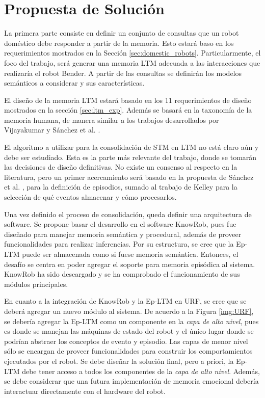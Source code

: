 \section{Propuesta de Solución}

%

La primera parte consiste en definir un conjunto de consultas que un robot doméstico debe responder a partir de la memoria. Esto estará baso en los requerimientos mostrados en la Sección \ref{sec:domestic_robots}. Particularmente, el foco del trabajo, será generar una memoria LTM adecuada a las interacciones que realizaría el robot Bender. A partir de las consultas se definirán los modelos semánticos a considerar y sus características. 

El diseño de la memoria LTM estará basado en los 11 requerimientos de diseño mostrados en la sección \ref{sec:ltm_exp}. Además se basará en la taxonomía de la memoria humana, de manera similar a los trabajos desarrollados por Vijayakumar  \cite{Vijayakumar2014} y Sánchez et al. \cite{Sanchez:2015}.

El algoritmo a utilizar para la consolidación de STM en LTM no está claro aún y debe ser estudiado. Esta es la parte más relevante del trabajo, donde se tomarán las decisiones de diseño definitivas. No existe un consenso al respecto en la literatura, pero un primer acercamiento será basado en la propuesta de Sánchez et al.  \cite{Sanchez:2015}, para la definición de episodios, sumado al trabajo de Kelley  \cite{Kelley2014} para la selección de qué eventos almacenar y cómo procesarlos.

Una vez definido el proceso de consolidación, queda definir una arquitectura de software. Se propone basar el desarrollo en el software KnowRob, pues fue diseñado para manejar memoria semántica y procedural, además de proveer funcionalidades para realizar inferencias. Por su estructura, se cree que la Ep-LTM puede ser almacenada como si fuese memoria semántica. Entonces, el desafío se centra en poder agregar el soporte para memoria episódica al sistema. KnowRob ha sido descargado y se ha comprobado el funcionamiento de sus módulos principales.

En cuanto a la integración de KnowRob y la Ep-LTM en URF, se cree que se deberá agregar un nuevo módulo al sistema. De acuerdo a la Figura \ref{img:URF}, se debería agregar la Ep-LTM como un componente en la \textit{capa de alto nivel}, pues es donde se manejan las máquinas de estado del robot y el único lugar donde se podrían abstraer los conceptos de evento y episodio. Las capas de menor nivel sólo se encargan de proveer funcionalidades para construir los comportamientos ejecutados por el robot. Se debe diseñar la solución final, pero a priori, la Ep-LTM debe tener acceso a todos los componentes de la \textit{capa de alto nivel}. Además, se debe considerar que una futura implementación de memoria emocional debería interactuar directamente con el hardware del robot. 


